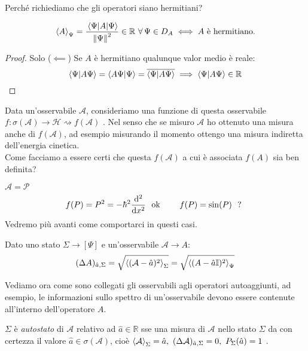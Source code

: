 Perché richiediamo che gli operatori siano hermitiani?
\begin{theorem}
    \begin{equation}
        \expval{A}_{\Psi}= \frac{\expval{A}{\Psi}}{\norm{\Psi}^2} \in \mathbb{R} \ \forall\, \Psi \in D_A \iff A \text{ è hermitiano.}
    \end{equation}
\end{theorem}
\begin{proof}
    Solo (\(\impliedby\)) Se \(A\) è hermitiano qualunque valor medio è reale:
    \[
        \braket{\Psi}{A\Psi}= \braket{A\Psi}{\Psi}= \overline{\braket{\Psi}{A\Psi}} \implies \braket{\Psi}{A\Psi} \in \mathbb{R}
    \]
\end{proof}

Data un'osservabile \(\mathcal{A}\), consideriamo una funzione di questa osservabile \(f: \sigma(\mathcal{A})\to\mathcal{H}\rightsquigarrow f(\mathcal{A})\) . 
Nel senso che se misuro \(\mathcal{A}\) ho ottenuto una misura anche di \(f(\mathcal{A})\), ad esempio misurando il momento ottengo una misura indiretta dell'energia cinetica.\\
Come facciamo a essere certi che questa \(f(\mathcal{A})\) a cui è associata \(f(A)\) sia ben definita?
\begin{example}\(\mathcal{A} = \mathcal{P}\)
    \[
        f(P) = P^2 = -\hbar^2\dv[2]{}{x} \ \text{ ok } \qquad f(P) = \sin(P) \ \text{ ? }
    \]
    Vedremo più avanti come comportarci in questi casi.
\end{example}

\begin{remark}
    Dato uno stato \(\Sigma\to [\Psi]\) e un'osservabile \(\mathcal{A} \to A \):
    \[
        (\Delta A )_{\hat{a}, \Sigma} = \sqrt{\expval{(\mathcal{A}-\hat{a})^2}_\Sigma}   = \sqrt{\expval{(A-\hat{a}\mathbb{I})^2}_{\Psi}}
    \]
\end{remark}


Vediamo ora come sono collegati gli osservabili agli operatori autoaggiunti,
ad esempio, le informazioni sullo spettro di un'osservabile devono essere contenute all'interno dell'operatore \(A\).
\begin{definition}
    \(\Sigma\) è \textit{autostato} di \(\mathcal{A}\) relativo ad \(\hat{a}\in \mathbb{R}\) sse una misura di \(\mathcal{A}\) nello stato
    \(\Sigma\) da con certezza il valore \(\hat{a} \in \sigma(\mathcal{A})\), cioè \(\expval{\mathcal{A}}_\Sigma = \hat{a}, \ (\Delta \mathcal{A})_{\hat{a}, \Sigma} = 0 , \ P_\Sigma(\hat{a})=1\) .
\end{definition}


